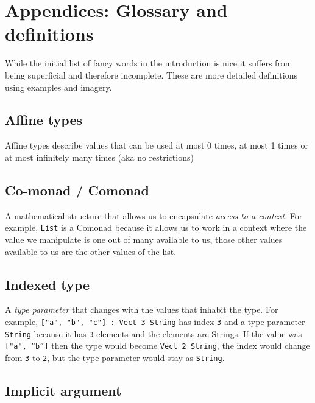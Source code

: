 \documentclass[
]{article}
\begin{document}
\newpage

\hypertarget{appendices-glossary-and-definitions}{%
\section{Appendices: Glossary and
definitions}\label{appendices-glossary-and-definitions}}

While the initial list of fancy words in the introduction is nice it
suffers from being superficial and therefore incomplete. These are more
detailed definitions using examples and imagery.

\hypertarget{affine-types}{%
\subsection{Affine types}\label{affine-types}}

Affine types describe values that can be used at most 0 times, at most 1
times or at most infinitely many times (aka no restrictions)

\hypertarget{co-monad-comonad}{%
\subsection{Co-monad / Comonad}\label{co-monad-comonad}}

A mathematical structure that allows us to encapsulate \emph{access to a
context}. For example, \texttt{List} is a Comonad because it allows us
to work in a context where the value we manipulate is one out of many
available to us, those other values available to us are the other values
of the list.

\hypertarget{indexed-type}{%
\subsection{Indexed type}\label{indexed-type}}

A \emph{type parameter} that changes with the values that inhabit the
type. For example, \texttt{{[}"a",\ "b",\ "c"{]}\ :\ Vect\ 3\ String}
has index \texttt{3} and a type parameter \texttt{String} because it has
\texttt{3} elements and the elements are Strings. If the value was
\texttt{{[}\textasciigrave{}"a",\ “b”{]}} then the type would become
\texttt{Vect\ 2\ String}, the index would change from \texttt{3} to
\texttt{2}, but the type parameter would stay as \texttt{String}.

\hypertarget{implicit-argument}{%
\subsection{Implicit argument}\label{implicit-argument}}
\end{document}
